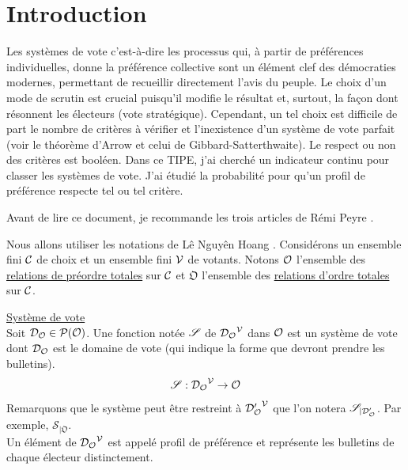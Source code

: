 
\section{Introduction}

Les systèmes de vote c'est-à-dire les processus qui, à partir de préférences individuelles, donne la préférence collective sont un élément clef des démocraties modernes, permettant de recueillir directement l'avis du peuple. Le choix d'un mode de scrutin est crucial puisqu’il modifie le résultat et, surtout, la façon dont résonnent les électeurs (vote stratégique). Cependant, un tel choix est difficile de part le nombre de critères à vérifier et l'inexistence d'un système de vote parfait (voir le théorème d'Arrow et celui de Gibbard-Satterthwaite). Le respect ou non des critères est booléen. Dans ce TIPE, j'ai cherché un indicateur continu pour classer les systèmes de vote. J'ai étudié la probabilité pour qu'un profil de préférence respecte tel ou tel critère.

Avant de lire ce document, je recommande les trois articles de Rémi Peyre \cite{math_démocratie}.

Nous allons utiliser les notations de Lê Nguyên Hoang \cite{randomized_Condorcet}. Considérons un ensemble fini $\mathcal{C}$ de choix et un ensemble fini $\mathcal{V}$ de votants. Notons $\mathcal{O}$ l'ensemble des \hyperref[Relation de préordre]{relations de préordre totales} sur $\mathcal{C}$ et $\mathfrak{O}$ l'ensemble des \hyperref[Relation d'ordre]{relations d'ordre totales} sur $\mathcal{C}$.

\begin{definition}
	\underline{Système de vote} \\
	Soit $\mathcal{D}_\mathcal{O} \in \mathcal{P}(\mathcal{O})$. Une fonction notée $\mathscr{S}$ de ${\mathcal{D}_\mathcal{O}}^{\mathcal{V}}$ dans $\mathcal{O}$ est un système de vote dont $\mathcal{D}_\mathcal{O}$ est le domaine de vote (qui indique la forme que devront prendre les bulletins).
	\begin{equation}
		\mathscr{S} : {\mathcal{D}_\mathcal{O}}^{\mathcal{V}} \rightarrow \mathcal{O}
	\end{equation}
	Remarquons que le système peut être restreint à ${\mathcal{D}_\mathcal{O}'}^{\mathcal{V}}$ que l'on notera $\mathscr{S}_{|\mathcal{D}_\mathcal{O}'}$. Par exemple, $\mathscr{S}_{|\mathfrak{O}}$. \\
	Un élément de ${\mathcal{D}_\mathcal{O}}^{\mathcal{V}}$ est appelé profil de préférence et représente les bulletins de chaque électeur distinctement.
\end{definition}